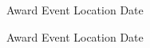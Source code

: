 



\begin{cvhonors}

  \cvhonor
    {Award} %
    {Event} %
    {Location} %
    {Date} %


\end{cvhonors}



\begin{cvhonors}

  \cvhonor
    {Award} %
    {Event} %
    {Location} %
    {Date} %


\end{cvhonors}
